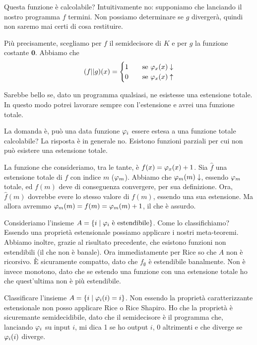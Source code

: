 Questa funzione è calcolabile? Intuitivamente no: supponiamo che lanciando il nostro programma $f$ 
termini. Non possiamo determinare se $g$ divergerà, quindi non saremo mai certi di cosa restituire.

Più precisamente, scegliamo per $f$ il semidecisore di $K$ e per $g$ la funzione costante $\bm{0}$.
Abbiamo che
\begin{equation*}
    (f || g)(x) =
    \begin{cases}
        1 \quad &\text{se $\varphi_{x}(x)\downarrow$}\\
        0 \quad &\text{se $\varphi_{x}(x)\uparrow$}\\
    \end{cases}
\end{equation*}

Sarebbe bello se, dato un programma qualsiasi, ne esistesse una estensione totale. In questo modo
potrei lavorare sempre con l'estensione e avrei una funzione totale.

La domanda è, può una data funzione $\varphi_{i}$ essere estesa a una funzione totale calcolabile? La
risposta è in generale no. Esistono funzioni parziali per cui non può esistere una estensione
totale.

La funzione che consideriamo, tra le tante, è $f(x) = \varphi_{x}(x) + 1$. Sia $\hat{f}$ una estensione
totale di $f$ con indice $m$ ($\varphi_{m}$). Abbiamo che $\varphi_{m}(m) \downarrow$, essendo $\varphi_{m}$ totale,
ed $f(m)$ deve di conseguenza convergere, per sua definizione. Ora, $\hat{f}(m)$ dovrebbe evere lo
stesso valore di $f(m)$, essendo una sua estensione. Ma allora avremmo $\varphi_{m}(m) = f(m) = \varphi_{m}(m) +
1$, il che è assurdo.

Consideriamo l'insieme $A = \{i \mid \varphi_{i} \text{ è estendibile}\}$. Come lo classifichiamo? Essendo una
proprietà estensionale possiamo applicare i nostri meta-teoremi. Abbiamo inoltre, grazie al
risultato precedente, che esistono funzioni non estendibili (il che non è banale). Ora
immediatamente per Rice so che $A$ non è ricorsivo. È sicuramente compatto, dato
che $f_{\emptyset}$ è estendibile banalmente. Non è invece monotono, dato che se estendo una
funzione con una estensione totale ho che quest'ultima non è più estendibile.

Classificare l'insieme $A = \{i \mid \varphi_{i}(i) = i\}$. Non essendo la proprietà caratterizzante
estensionale non posso applicare Rice o Rice Shapiro. Ho che la proprietà è sicuremante
semidecidibile, dato che il semidecisore è il programma che, lanciando $\varphi_{i}$ su input $i$, mi dica 1
se ho output $i$, 0 altrimenti e che diverge se $\varphi_{i}(i)$ diverge.

